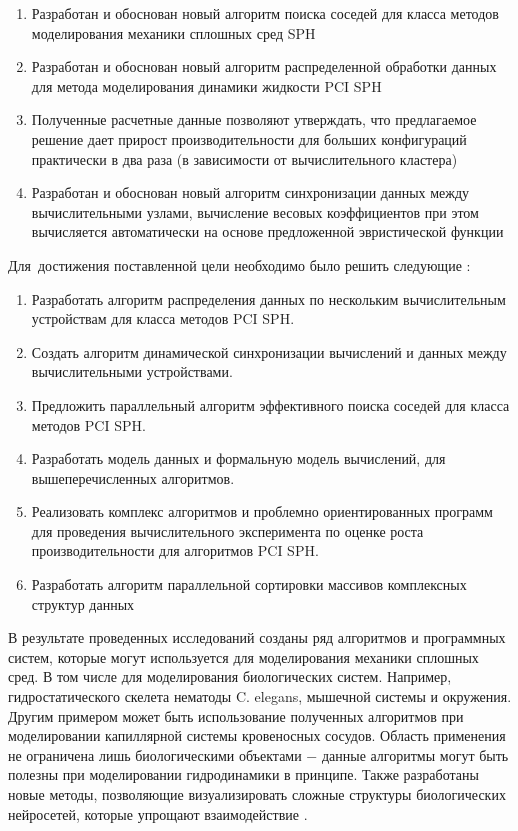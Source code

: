 {}
\begin{enumerate}
  \item Разработан и обоснован новый алгоритм поиска соседей для класса методов моделирования механики сплошных сред SPH
  \item Разработан и обоснован новый алгоритм распределенной обработки данных для метода моделирования динамики жидкости PCI SPH
  \item Полученные расчетные данные позволяют утверждать, что предлагаемое решение дает прирост производительности для больших конфигураций практически в два раза (в зависимости от вычислительного кластера)
  \item Разработан и обоснован новый алгоритм синхронизации данных между вычислительными узлами, вычисление весовых коэффициентов при этом вычисляется автоматически на основе предложенной эвристической функции
\end{enumerate}

Для~достижения поставленной цели необходимо было решить следующие {\tasks}:
\begin{enumerate}
  \item Разработать алгоритм распределения данных по нескольким вычислительным устройствам для класса методов PCI SPH.
  \item Создать алгоритм динамической синхронизации вычислений и данных между вычислительными устройствами.
  \item Предложить параллельный  алгоритм эффективного поиска соседей для класса методов PCI SPH.
  \item Разработать модель данных и формальную модель  вычислений, для вышеперечисленных алгоритмов.
  \item Реализовать комплекс алгоритмов и проблемно ориентированных программ для проведения вычислительного эксперимента по оценке роста производительности для алгоритмов PCI SPH.
  \item Разработать алгоритм параллельной сортировки массивов комплексных структур данных
\end{enumerate}


{\influence} В результате проведенных исследований созданы ряд алгоритмов и программных систем, которые могут используется для моделирования механики сплошных сред. В том числе для моделирования биологических систем. Например, гидростатического скелета нематоды C. elegans, мышечной системы и окружения. Другим примером может быть использование полученных алгоритмов при моделировании капиллярной системы кровеносных сосудов. Область применения не ограничена лишь биологическими объектами − данные алгоритмы могут быть полезны при моделировании гидродинамики в принципе. Также разработаны новые методы, позволяющие визуализировать сложные структуры  биологических нейросетей, которые упрощают взаимодействие .

